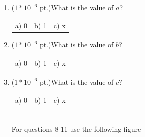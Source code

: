 \documentclass{article}
\begin{document}
\begin{enumerate}
\item {($1*10^{-6}$ pt.)}What is the value of $a$?

\begin{tabular}{p{0.6in} p{0.6in} p{0.6in}}
a) 0 & b) 1 & c) x 
\end{tabular}

\item {($1*10^{-6}$ pt.)}What is the value of $b$?

\begin{tabular}{p{0.6in} p{0.6in} p{0.6in}}
a) 0 & b) 1 & c) x 
\end{tabular}

\item {($1*10^{-6}$ pt.)}What is the value of $c$?

\begin{tabular}{p{0.6in} p{0.6in} p{0.6in}}
a) 0 & b) 1 & c) x 
\end{tabular} \\

For questions 8-11 use the following figure


\end{enumerate}
\end{document}
